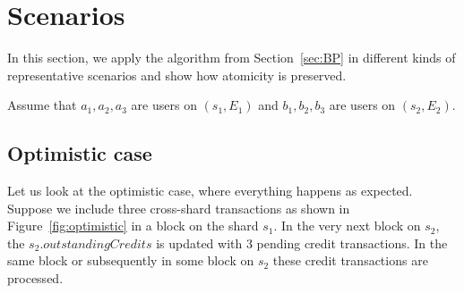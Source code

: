 \documentclass{article}
\begin{document}





\section{Scenarios}
In this section, we apply the algorithm from Section~\ref{sec:BP} in different kinds of representative scenarios and show how atomicity is preserved.

Assume that $a_1, a_2, a_3$ are users on $(s_1,E_1)$ and $b_1,b_2,b_3$ are users on $(s_2,E_2)$.

\subsection{Optimistic case}
Let us look at the optimistic case, where everything happens as expected. Suppose we include three cross-shard transactions as shown in Figure~\ref{fig:optimistic} in a block on the shard $s_1$. In the very next block on $s_2$, the $s_2.outstandingCredits$ is updated with 3 pending credit transactions. In the same block or subsequently in some block on $s_2$ these credit transactions are processed. 
\end{document}
